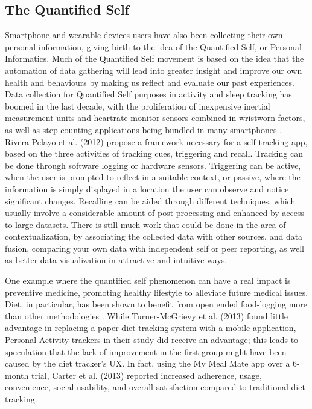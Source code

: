 \subsection{The Quantified Self}
Smartphone and wearable devices users have also been collecting their own personal information, giving birth to the idea of the Quantified Self, or Personal Informatics. \cite{rapp2014}
Much of the Quantified Self movement is based on the idea that the automation of data gathering will lead into greater insight and improve our own health and behaviours by making us reflect and evaluate our past experiences. Data collection for Quantified Self purposes in activity and sleep tracking has boomed in the last decade, with the proliferation of inexpensive inertial measurement units and heartrate monitor sensors combined in wristworn factors, as well as step counting applications being bundled in many smartphones \cite{Crawford2015}.\\
Rivera-Pelayo et al. (2012)\cite{Rivera-Pelayo2012} propose a framework necessary for a self tracking app, based on the three activities of tracking cues, triggering and recall.
Tracking can be done through software logging or hardware sensors. Triggering can be active, when the user is prompted to reflect in a suitable context, or passive, where the information is simply displayed in a location the user can observe and notice significant changes. Recalling can be aided through different techniques, which usually involve a considerable amount of post-processing and enhanced by access to large datasets. There is still much work that could be done in the area of contextualization, by associating the collected data with other sources, and data fusion, comparing your own data with independent self or peer reporting, as well as better data visualization in attractive and intuitive ways.

One example where the quantified self phenomenon can have a real impact is preventive medicine, promoting healthy lifestyle to alleviate future medical issues. Diet, in particular, has been shown to benefit from open ended food-logging more than other methodologies \cite{Bingham1994}. While Turner-McGrievy et al. (2013)\cite{Turner-McGrievy2013} found little advantage in replacing a paper diet tracking system with a mobile application, Personal Activity trackers in their study did receive an advantage; this leads to speculation that the lack of improvement in the first group might have been caused by the diet tracker's UX. In fact, using the My Meal Mate app over a 6-month trial, Carter et al. (2013)\cite{carter2013adherence} reported increased adherence, usage, convenience, social usability, and overall satisfaction compared to traditional diet tracking. 

